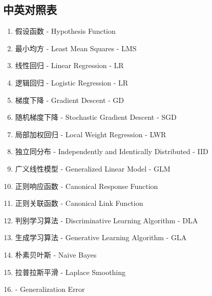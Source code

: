 \subsection{中英对照表}
\begin{enumerate}
	\item 假设函数 - Hypothesis Function
	\item 最小均方 - Least Mean Squares - LMS
	\item 线性回归 - Linear Regression - LR
	\item 逻辑回归 - Logistic Regression - LR
	\item 梯度下降 - Gradient Descent - GD
	\item 随机梯度下降 - Stochastic Gradient Descent - SGD
	\item 局部加权回归 - Local Weight Regression - LWR
	\item 独立同分布 - Independently and Identically Distributed - IID
	\item 广义线性模型 - Generalized Linear Model - GLM
	\item 正则响应函数 - Canonical Response Function
	\item 正则关联函数 - Canonical Link Function
	\item 判别学习算法 - Discriminative Learning Algorithm - DLA
	\item 生成学习算法 - Generative Learning Algorithm - GLA
	\item 朴素贝叶斯 - Naive Bayes
	\item 拉普拉斯平滑 - Laplace Smoothing
	\item  - Generalization Error
\end{enumerate}